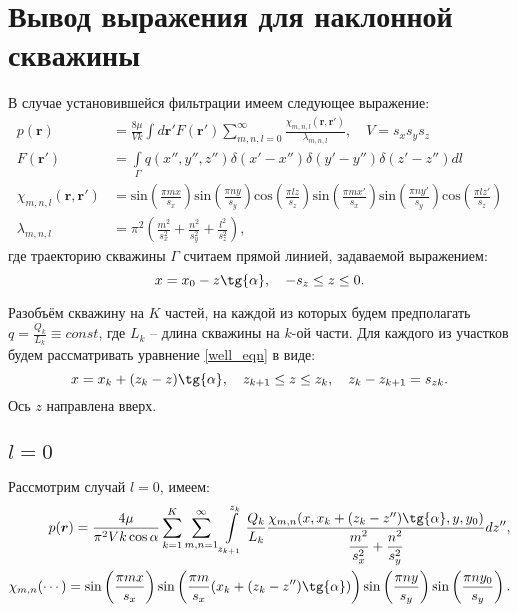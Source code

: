 \documentclass[a4paper,12pt]{article}
\begin{document}
	
\section*{Вывод выражения для наклонной скважины}
\setcounter{equation}{0}

	В случае установившейся фильтрации имеем следующее выражение:
\begin{align}
	\label{initial_statement}
	p(\boldsymbol{r}) &= \frac{8\mu}{V k}\int d\boldsymbol{r}' F(\boldsymbol{r}') \sum\limits_{m, n, l = 0}^{\infty} \frac{\chi_{m, n, l}(\boldsymbol{r}, \boldsymbol{r}')}{\lambda_{m, n, l}}, \quad V=s_x s_y s_z \\
	F(\boldsymbol{r}') &= \int\limits_{\Gamma} q(x'', y'', z'')\delta(x' -x'')\delta(y'-y'')\delta(z'-z'')dl \\
	\chi_{m,n,l}(\boldsymbol{r}, \boldsymbol{r}') &= \text{sin}\left(\frac{\pi m x}{s_x}\right)\text{sin}\left(\frac{\pi n y}{s_y}\right)\text{cos}\left(\frac{\pi l z}{s_z}\right) \text{sin}\left(\frac{\pi m x'}{s_x}\right)\text{sin}\left(\frac{\pi n y'}{s_y}\right)\text{cos}\left(\frac{\pi l z'}{s_z}\right) \\
	 \lambda_{m, n, l} &= \pi^2 \left(\frac{m^2}{s_x^2}+\frac{n^2}{s_y^2}+\frac{l^2}{s_z^2}\right),
\end{align}
	где траекторию скважины $\Gamma$ считаем прямой линией, задаваемой выражением:
\begin{equation}
	\label{well_eqn}
	x = x_0 - z\tg{\alpha}, \quad -s_z \leq z \leq 0.
\end{equation}

	Разобъём скважину на $K$ частей, на каждой из которых будем предполагать $q = \displaystyle\frac{Q_k}{L_k} \equiv \textit{const}$, где $L_k$ -- длина скважины на $k$-ой части. Для каждого из участков будем рассматривать уравнение \eqref{well_eqn} в виде:
\begin{equation}
	\label{well_eqn1}
	x = x_k + (z_{k} - z) \tg{\alpha}, \quad z_{k+1} \leq z \leq z_{k}, \quad z_{k}-z_{k+1} = s_{zk}.
\end{equation}
	Ось $z$ направлена вверх.

\subsection*{$l=0$}
	Рассмотрим случай $l = 0$, имеем:
\begin{align}
	\label{eqn1}
	p(\boldsymbol{r}) = \frac{4\mu}{\pi^2V k\cos{\alpha}}\sum\limits_{k=1}^K \sum\limits_{m, n = 1}^{\infty}\int\limits_{z_{k+1}}^{z_{k}}\frac{Q_k}{L_k}\frac{\chi_{m, n}(x, x_k+(z_{k}-z'')\tg{\alpha}, y, y_0)}{\displaystyle\frac{m^2}{s_x^2} + \frac{n^2}{s_y^2}}dz'',\\
	\chi_{m, n}(\cdots) = \sin\left({\frac{\pi m x}{s_x}}\right)\sin\left({\frac{\pi m}{s_x}(x_k + (z_{k}-z'')\tg{\alpha})}\right)\sin\left({\frac{\pi n y}{s_y}}\right)\sin\left({\frac{\pi n y_0}{s_y}}\right).
\end{align}
	
\end{document}
